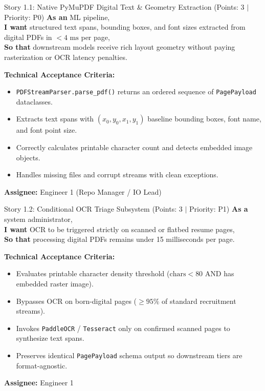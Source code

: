\documentclass[11pt,a4paper]{article}
\begin{document}
\vspace{0.5em}

\begin{storybox}{Story 1.1: Native PyMuPDF Digital Text \& Geometry Extraction (Points: 3 $|$ Priority: P0)}
\textbf{As an} ML pipeline, \\
\textbf{I want} structured text spans, bounding boxes, and font sizes extracted from digital PDFs in $<4\text{ ms}$ per page, \\
\textbf{So that} downstream models receive rich layout geometry without paying rasterization or OCR latency penalties.

\vspace{0.3em}
\textbf{Technical Acceptance Criteria:}
\begin{itemize}[leftmargin=1.2em, itemsep=1pt]
    \item \texttt{PDFStreamParser.parse\_pdf()} returns an ordered sequence of \texttt{PagePayload} dataclasses.
    \item Extracts text spans with $(x_0, y_0, x_1, y_1)$ baseline bounding boxes, font name, and font point size.
    \item Correctly calculates printable character count and detects embedded image objects.
    \item Handles missing files and corrupt streams with clean exceptions.
\end{itemize}
\textbf{Assignee:} Engineer 1 (Repo Manager / IO Lead)
\end{storybox}

\begin{storybox}{Story 1.2: Conditional OCR Triage Subsystem (Points: 3 $|$ Priority: P1)}
\textbf{As a} system administrator, \\
\textbf{I want} OCR to be triggered strictly on scanned or flatbed resume pages, \\
\textbf{So that} processing digital PDFs remains under 15 milliseconds per page.

\vspace{0.3em}
\textbf{Technical Acceptance Criteria:}
\begin{itemize}[leftmargin=1.2em, itemsep=1pt]
    \item Evaluates printable character density threshold ($\text{chars} < 80$ AND has embedded raster image).
    \item Bypasses OCR on born-digital pages ($\ge 95\%$ of standard recruitment streams).
    \item Invokes \texttt{PaddleOCR} / \texttt{Tesseract} only on confirmed scanned pages to synthesize text spans.
    \item Preserves identical \texttt{PagePayload} schema output so downstream tiers are format-agnostic.
\end{itemize}
\textbf{Assignee:} Engineer 1
\end{storybox}
\end{document}
